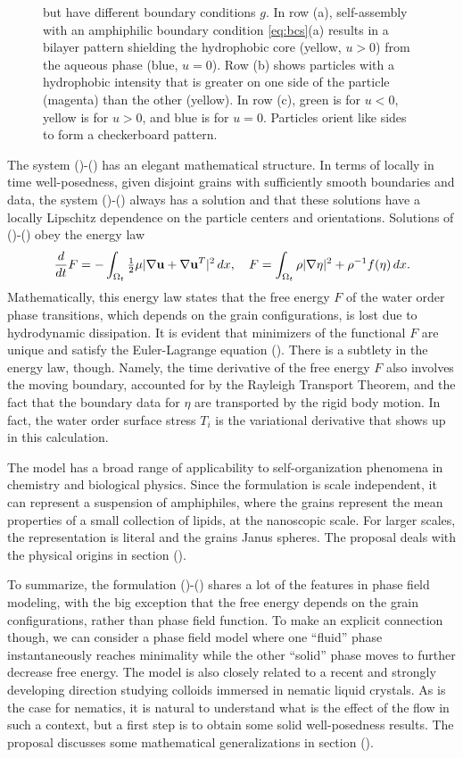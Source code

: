 \begin{figure}[h]
{    but have different boundary conditions $g.$ 
    In row (a), self-assembly with an amphiphilic boundary
    condition \eqref{eq:bcs}(a) results in a bilayer pattern shielding
    the hydrophobic core (yellow, $u > 0$) from the aqueous phase (blue, $u = 0$).
    Row (b) shows particles with a hydrophobic intensity that is
    greater on one side of the particle (magenta) than the other (yellow).
    In row (c), green is for $u < 0$, yellow is for $u > 0$, and blue is for $u = 0$.
    Particles orient like sides to form a checkerboard pattern.\\
  }
\end{figure}


The system ()-() has an elegant mathematical structure.
In terms of locally in time well-posedness, given disjoint grains with
sufficiently smooth boundaries
and data, the system ()-() always has a solution and that these solutions
have a locally Lipschitz dependence on the particle centers and orientations. 
Solutions of ()-() obey the energy law
\begin{equation}
  \frac{d}{dt}F
  = - \int_{\Omega_t} \tfrac{1}{2}\mu|\nabla \mathbf{u} + \nabla \mathbf{u}^T|^2 \,dx,
  \quad
  F = \int_{\Omega_t}
  \rho |\nabla \eta|^2 + \rho^{-1} f(\eta) \,dx.
\end{equation}
Mathematically, this energy law states that the free energy $F$ of the water order
phase transitions, which depends on the grain configurations, is lost due to
hydrodynamic dissipation.  It is evident that minimizers of the functional $F$
are unique and satisfy the Euler-Lagrange equation ().
There is a subtlety in the energy law, though.  Namely, the
time derivative of the free energy $F$ also involves the moving
boundary, accounted for by the Rayleigh Transport Theorem, and the
fact that the boundary data for $\eta$ are transported by the rigid body motion.
In fact, the water order surface stress $T_i$ is the variational derivative that
shows up in this calculation.

The model has a broad range of applicability to self-organization phenomena
in chemistry and biological physics. Since the formulation is
scale independent, it can represent a suspension of amphiphiles,
where the grains represent
the mean properties of a small collection of lipids, at the nanoscopic scale.
For larger scales, the representation is literal and the grains Janus spheres.  
The proposal deals with the physical origins in section (). 

To summarize, the formulation ()-() shares a lot of the features in phase field modeling,
with the big exception that the free energy depends on the grain configurations,
rather than phase field
function.
To make an explicit connection though, we can consider a phase field model 
where one ``fluid'' phase instantaneously reaches minimality while the other ``solid''
phase moves to further decrease free energy. 
The model is also closely related to
a recent and strongly developing direction studying 
colloids immersed in nematic liquid crystals.
As is the case for nematics, it is natural to understand what is the effect of the flow in
such a context, but a first step is to obtain some solid well-posedness results.
The proposal discusses some mathematical generalizations in section ().  

